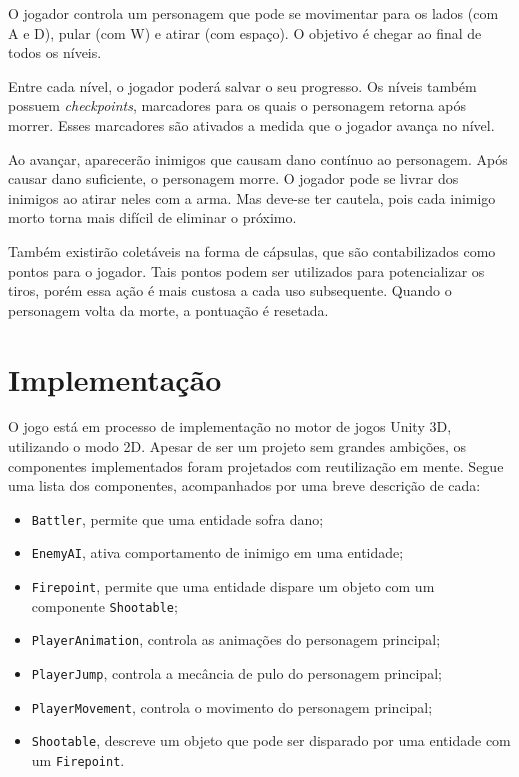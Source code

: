 \documentclass[a4paper]{article}
\begin{document}
O jogador controla um personagem que pode se movimentar para os lados (com A e D), pular (com W) e atirar (com espaço). O objetivo é chegar ao final de todos os níveis.

Entre cada nível, o jogador poderá salvar o seu progresso. Os níveis também possuem \emph{checkpoints}, marcadores para os quais o personagem retorna após morrer. Esses marcadores são ativados a medida que o jogador avança no nível.

Ao avançar, aparecerão inimigos que causam dano contínuo ao personagem. Após causar dano suficiente, o personagem morre. O jogador pode se livrar dos inimigos ao atirar neles com a arma. Mas deve-se ter cautela, pois cada inimigo morto torna mais difícil de eliminar o próximo. 

Também existirão coletáveis na forma de cápsulas, que são contabilizados como pontos para o jogador. Tais pontos podem ser utilizados para potencializar os tiros, porém essa ação é mais custosa a cada uso subsequente. Quando o personagem volta da morte, a pontuação é resetada.


\section{Implementação}

O jogo está em processo de implementação no motor de jogos Unity 3D, utilizando o modo 2D. Apesar de ser um projeto sem grandes ambições, os componentes implementados foram projetados com reutilização em mente.
Segue uma lista dos componentes, acompanhados por uma breve descrição de cada:
\begin{itemize}
	\item \texttt{Battler}, permite que uma entidade sofra dano;
	\item \texttt{EnemyAI}, ativa comportamento de inimigo em uma entidade;
	\item \texttt{Firepoint}, permite que uma entidade dispare um objeto com um componente \texttt{Shootable};
	\item \texttt{PlayerAnimation}, controla as animações do personagem principal;
	\item \texttt{PlayerJump}, controla a mecância de pulo do personagem principal;
	\item \texttt{PlayerMovement}, controla o movimento do personagem principal;
	\item \texttt{Shootable}, descreve um objeto que pode ser disparado por uma entidade com um \texttt{Firepoint}.
\end{itemize}
\end{document}
